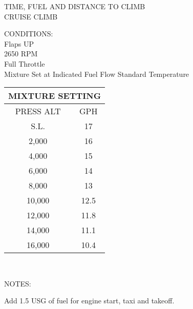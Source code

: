 \begin{figure}[t]
\begin{center}
\begin{perfhdr}TIME, FUEL AND DISTANCE TO CLIMB\\
CRUISE CLIMB\\
\end{perfhdr}
\Large
\normalsize
\vspace{5ex}
\begin{minipage}{4in}
  \begin{flushleft}
    CONDITIONS:\\
    Flaps UP\\
    2650 RPM\\
    Full Throttle\\
    Mixture Set at Indicated Fuel Flow
    Standard Temperature\\
    \end{flushleft}
\end{minipage}
\hfill
\begin{minipage}{1.5in}
  \begin{tabular}{|c|c|}
    \hline
    \multicolumn{2}{|c|}{MIXTURE SETTING}\\
    \hline
    PRESS ALT&GPH\\
    \hline
    S.L.&17\\
    2,000&16\\
    4,000&15\\
    6,000&14\\
    8,000&13\\
    10,000&12.5\\
    12,000&11.8\\
    14,000&11.1\\
    16,000&10.4\\
    \hline
    \end{tabular}
  \end{minipage}
\\
\vspace{\perfnoteskip}
    \raggedright NOTES:
    \begin{enumerate*}
      \item Add 1.5 USG of fuel for engine start, taxi and takeoff.

\end{enumerate*}
\end{center}
\end{figure}
